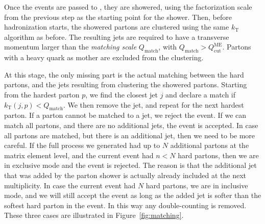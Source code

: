 Once the events are passed to \PYTHIA, they are showered, using the factorization scale from the
previous step as the starting point for the shower. Then, before hadronization starts, the showered
partons are clustered using the same $k_{\mathrm{T}}$ algorithm as before. The resulting jets are
required to have a transverse momentum larger than the \textit{matching scale} $Q_{\mathrm{match}}$,
with $Q_{\mathrm{match}} > Q_{\mathrm{cut}}^{\mathrm{ME}}$. 
Partons with a heavy quark as mother are excluded from the clustering. 

At this stage, the only missing part is the actual matching between the hard partons, and the jets
resulting from clustering the showered partons. Starting from the hardest parton $p$, we find the
closest jet $j$ and declare a match if $k_{\mathrm{T}}(j,p) < Q_{\mathrm{match}}$. We then remove
the jet, and repeat for the next hardest parton. If a parton cannot be matched to a jet, we reject
the event. 
If we can match all partons, and there are no additional jets, the event is accepted. 
In case all partons are matched, but there is an additional jet, then we need to be more careful. 
If the full process we generated had up to $N$ additional partons at the matrix element level, and
the current event had $n < N$ hard partons, then we are in exclusive mode and the event is rejected.
The reason is that the additional jet that was added by the parton shower is actually already
included at the next multiplicity. In case the current event had $N$ hard partons, we are in
inclusive mode, and we will still accept the event as long as the added jet is softer than the
softest hard parton in the event. 
In this way any double-counting is removed. These three cases are illustrated in
Figure~\ref{fig:matching}. 

